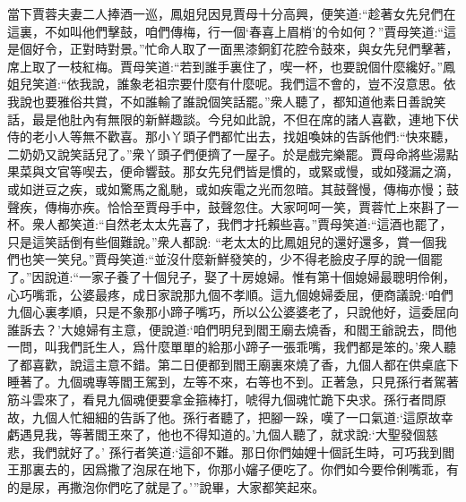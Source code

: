 \begin{parag}
    當下賈蓉夫妻二人捧酒一巡，鳳姐兒因見賈母十分高興，便笑道:“趁著女先兒們在這裏，不如叫他們擊鼓，咱們傳梅，行一個‘春喜上眉梢’的令如何？”賈母笑道:“這是個好令，正對時對景。”忙命人取了一面黑漆銅釘花腔令鼓來，與女先兒們擊著，席上取了一枝紅梅。賈母笑道:“若到誰手裏住了，喫一杯，也要說個什麼纔好。”鳳姐兒笑道:“依我說，誰象老祖宗要什麼有什麼呢。我們這不會的，豈不沒意思。依我說也要雅俗共賞，不如誰輸了誰說個笑話罷。”衆人聽了，都知道他素日善說笑話，最是他肚內有無限的新鮮趣談。今兒如此說，不但在席的諸人喜歡，連地下伏侍的老小人等無不歡喜。那小丫頭子們都忙出去，找姐喚妹的告訴他們:“快來聽，二奶奶又說笑話兒了。”衆丫頭子們便擠了一屋子。於是戲完樂罷。賈母命將些湯點果菜與文官等喫去，便命響鼓。那女先兒們皆是慣的，或緊或慢，或如殘漏之滴，或如迸豆之疾，或如驚馬之亂馳，或如疾電之光而忽暗。其鼓聲慢，傳梅亦慢；鼓聲疾，傳梅亦疾。恰恰至賈母手中，鼓聲忽住。大家呵呵一笑，賈蓉忙上來斟了一杯。衆人都笑道:“自然老太太先喜了，我們才托賴些喜。”賈母笑道:“這酒也罷了，只是這笑話倒有些個難說。”衆人都說: “老太太的比鳳姐兒的還好還多，賞一個我們也笑一笑兒。”賈母笑道:“並沒什麼新鮮發笑的，少不得老臉皮子厚的說一個罷了。”因說道:“一家子養了十個兒子，娶了十房媳婦。惟有第十個媳婦最聰明伶俐，心巧嘴乖，公婆最疼，成日家說那九個不孝順。這九個媳婦委屈，便商議說:‘咱們九個心裏孝順，只是不象那小蹄子嘴巧，所以公公婆婆老了，只說他好，這委屈向誰訴去？’大媳婦有主意，便說道:‘咱們明兒到閻王廟去燒香，和閻王爺說去，問他一問，叫我們託生人，爲什麼單單的給那小蹄子一張乖嘴，我們都是笨的。’衆人聽了都喜歡，說這主意不錯。第二日便都到閻王廟裏來燒了香，九個人都在供桌底下睡著了。九個魂專等閻王駕到，左等不來，右等也不到。正著急，只見孫行者駕著筋斗雲來了，看見九個魂便要拿金箍棒打，唬得九個魂忙跪下央求。孫行者問原故，九個人忙細細的告訴了他。孫行者聽了，把腳一跺，嘆了一口氣道:‘這原故幸虧遇見我，等著閻王來了，他也不得知道的。’九個人聽了，就求說:‘大聖發個慈悲，我們就好了。’ 孫行者笑道:‘這卻不難。那日你們妯娌十個託生時，可巧我到閻王那裏去的，因爲撒了泡尿在地下，你那小嬸子便吃了。你們如今要伶俐嘴乖，有的是尿，再撒泡你們吃了就是了。’”說畢，大家都笑起來。
\end{parag}


